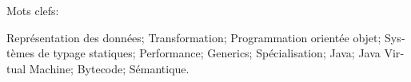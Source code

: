 \begin{otherlanguage}{french}
\vspace{0.3em}


Mots clefs:

Représentation des données; Transformation; Programmation orientée objet; Systèmes de typage statiques; Performance; Generics; Spécialisation; Java; Java Virtual Machine; Bytecode; Sémantique.
\end{otherlanguage}


